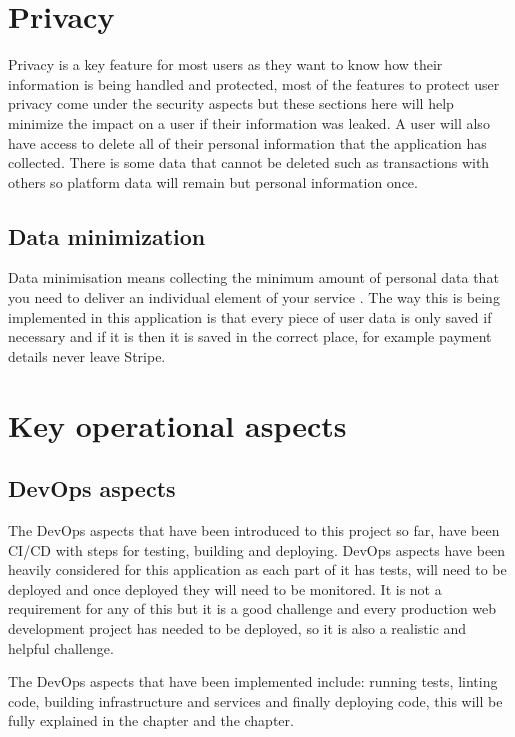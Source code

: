 \documentclass[]{project_report}
\begin{document}
\section{Privacy}

Privacy is a key feature for most users as they want to know how their information is being handled and protected, most of the features to protect user privacy come under the security aspects but these sections here will help minimize the impact on a user if their information was leaked. A user will also have access to delete all of their personal information that the application has collected. There is some data that cannot be deleted such as transactions with others so platform data will remain but personal information once.

\subsection{Data minimization}

Data minimisation means collecting the minimum amount of personal data that you need to deliver an individual element of your service \cite{ico_data_minimisation}. The way this is being implemented in this application is that every piece of user data is only saved if necessary and if it is then it is saved in the correct place, for example payment details never leave Stripe. 

\section{Key operational aspects}

\subsection{DevOps aspects}

The DevOps aspects that have been introduced to this project so far, have been CI/CD with steps for testing, building and deploying. DevOps aspects have been heavily considered for this application as each part of it has tests, will need to be deployed and once deployed they will need to be monitored. It is not a requirement for any of this but it is a good challenge and every production web development project has needed to be deployed, so it is also a realistic and helpful challenge.

The DevOps aspects that have been implemented include: running tests, linting code, building infrastructure and services and finally deploying code, this will be fully explained in the  chapter and the  chapter.
\end{document}
